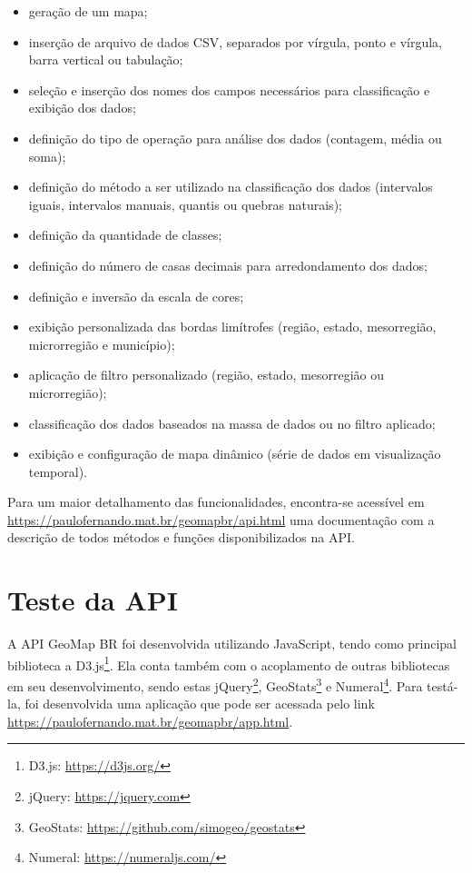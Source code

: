 \documentclass[12pt]{article}
\begin{document}
\begin{itemize}
\item geração de um mapa;
\item inserção de arquivo de dados CSV, separados por vírgula, ponto e vírgula, barra vertical ou tabulação;
\item seleção e inserção dos nomes dos campos necessários para classificação e exibição dos dados;
\item definição do tipo de operação para análise dos dados (contagem, média ou soma);
\item definição do método a ser utilizado na classificação dos dados (intervalos iguais, intervalos manuais, quantis ou quebras naturais);
\item definição da quantidade de classes;
\item definição do número de casas decimais para arredondamento dos dados;
\item definição e inversão da escala de cores;
\item exibição personalizada das bordas limítrofes (região, estado, mesorregião, microrregião e município);
\item aplicação de filtro personalizado (região, estado, mesorregião ou microrregião);
\item classificação dos dados baseados na massa de dados ou no filtro aplicado;
\item exibição e configuração de mapa dinâmico (série de dados em visualização temporal).
\end{itemize}

Para um maior detalhamento das funcionalidades, encontra-se acessível em \href{https://paulofernando.mat.br/geomapbr/api.html}{https://paulofernando.mat.br/geomapbr/api.html} uma documentação com a descrição de todos métodos e funções disponibilizados na API.

\section{Teste da API} \label{teste}

A API GeoMap BR foi desenvolvida utilizando JavaScript, tendo como principal biblioteca a D3.js\footnote{D3.js: \href{https://d3js.org/}{https://d3js.org/}}. Ela conta também com o acoplamento de outras bibliotecas em seu desenvolvimento, sendo estas jQuery\footnote{jQuery: \href{https://jquery.com}{https://jquery.com}}, GeoStats\footnote{GeoStats: \href{https://github.com/simogeo/geostats}{https://github.com/simogeo/geostats}} e Numeral\footnote{Numeral: \href{https://numeraljs.com/}{https://numeraljs.com/}}. Para testá-la, foi desenvolvida uma aplicação que pode ser acessada pelo link \href{https://paulofernando.mat.br/geomapbr/app.html}{https://paulofernando.mat.br/geomapbr/app.html}.
\end{document}
